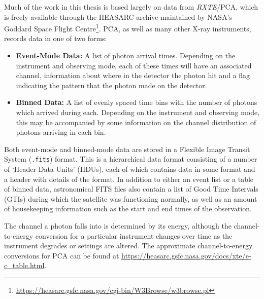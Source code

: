 \par Much of the work in this thesis is based largely on data from \textit{RXTE}/PCA, which is freely available through the HEASARC archive maintained by NASA's Goddard Space Flight Centre\footnote{\url{https://heasarc.gsfc.nasa.gov/cgi-bin/W3Browse/w3browse.pl}}.  PCA, as well as many other X-ray instruments, records data in one of two forms:
\begin{itemize}
\item \textbf{Event-Mode Data:} A list of photon arrival times.  Depending on the instrument and observing mode, each of these times will have an associated channel, information about where in the detector the photon hit and a flag indicating the pattern that the photon made on the detector.
\item \textbf{Binned Data:} A list of evenly spaced time bins with the number of photons which arrived during each.  Depending on the instrument and observing mode, this may be accompanied by some information on the channel distribution of photons arriving in each bin.
\end{itemize}
\par Both event-mode and binned-mode data are stored in a Flexible Image Transit System (\texttt{.fits}) format.  This is a hierarchical data format consisting of a number of `Header Data Units' (HDUs), each of which contains data in some format and a header with details of the format.  In addition to either an event list or a table of binned data, astronomical FITS files also contain a list of Good Time Intervals (GTIs) during which the satellite was functioning normally, as well as an amount of housekeeping information such as the start and end times of the observation.
\par The channel a photon falls into is determined by its energy, although the channel-to-energy conversion for a particular instrument changes over time as the instrument degrades or settings are altered.  The approximate channel-to-energy conversions for PCA can be found at \url{https://heasarc.gsfc.nasa.gov/docs/xte/e-c_table.html}.
